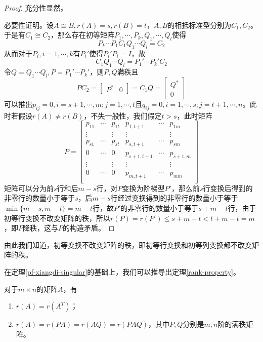 \begin{proof}
    \label{pf-xiangdi-singular}
    充分性显然。

    必要性证明。设$A\cong B,r(A)=s,r(B)=t$，$A,B$的相抵标准型分别为$C_1,C_2$。于是有$C_1\cong C_2$，那么存在初等矩阵$P_1,\cdots,P_k,Q_1,\cdots,Q_l$使得
    $$
    P_k\cdots P_1C_1Q_1\cdots Q_l=C_2
    $$
    从而对于$P_i,i=1,\cdots,k$有$P_i'$使得$P_i' P_i=I$，故
    $$
    C_1Q_1\cdots Q_l=P_1'\cdots P_k'C_2
    $$
    令$Q=Q_1\cdots Q_l,P=P_1'\cdots P_k'$，则$P,Q$满秩且
    $$
    PC_2=\begin{bmatrix}
        P^* & 0
    \end{bmatrix}=C_1Q=\begin{bmatrix}
        Q^* \\ 0
    \end{bmatrix}
    $$
    可以推出$p_{ij}=0,i=s+1,\cdots,m;j=1,\cdots,t$且$q_{ij}=0,i=1,\cdots,s;j=t+1,\cdots,n$。此时若假设$r(A)\neq r(B)$，不失一般性，我们假定$t>s$，此时矩阵
    $$
    P=\begin{bmatrix}
        p_{11} & \cdots & p_{1t} & p_{1,t+1} & \cdots & p_{1m} \\
        \vdots & & \vdots & \vdots & & \vdots \\
        p_{s1} & \cdots & p_{st} & p_{s,t+1} & \cdots & p_{sm} \\
        0 & \cdots & 0 & p_{s+1,t+1} & \cdots & p_{s+1,m} \\
        \vdots & & \vdots & \vdots & & \vdots \\
        0 & \cdots & 0 & p_{m,t+1} & \cdots & p_{mm} \\
    \end{bmatrix}
    $$
    矩阵可以分为前$s$行和后$m-s$行，对$P$变换为阶梯型$P'$，那么前$s$行变换后得到的非零行的数量小于等于$s$，后$m-s$行经过变换得到的非零行的数量小于等于$\min\{m-s,m-t\}=m-t$行，故$P'$的非零行的数量小于等于$s+m-t$行，由于初等行变换不改变矩阵的秩，所以$r(P)=r(P')\leqslant s+m-t<t+m-t=m$，即$P$降秩，这与$P$的构造矛盾。
\end{proof}

\begin{remark}
    由此我们知道，初等变换不改变矩阵的秩，即初等行变换和初等列变换都不改变矩阵的秩。
\end{remark}

在定理\ref{pf-xiangdi-singular}的基础上，我们可以推导出定理\ref{rank-property}。

\begin{thm}
    \label{rank-property}
    对于$m\times n$的矩阵$A$，有
    \begin{enumerate}
        \item $r(A)=r(A^T)$；
        \item $r(A)=r(PA)=r(AQ)=r(PAQ)$，其中$P,Q$分别是$m,n$阶的满秩矩阵。
    \end{enumerate}
\end{thm}



